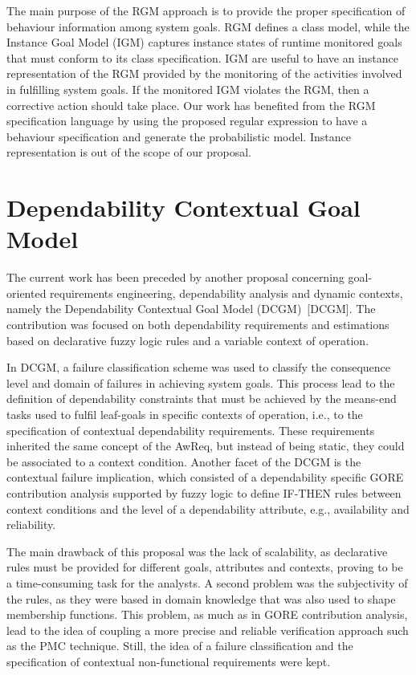 The main purpose of the RGM approach is to provide the proper specification of behaviour information among system goals. RGM defines a class model, while the Instance Goal Model (IGM) captures instance states of runtime monitored goals that must conform to its class specification. IGM are useful to have an instance representation of the RGM provided by the monitoring of the activities involved in fulfilling system goals. If the monitored IGM violates the RGM, then a corrective action should take place. Our work has benefited from the RGM specification language by using the proposed regular expression to have a behaviour specification and generate the probabilistic model. Instance representation is out of the scope of our proposal.


\section{Dependability Contextual Goal Model}

The current work has been preceded by another proposal concerning goal-oriented requirements engineering, dependability analysis and dynamic contexts, namely the Dependability Contextual Goal Model (DCGM)~[DCGM]. The contribution was focused on both dependability requirements and estimations based on declarative fuzzy logic rules and a variable context of operation.

In DCGM, a failure classification scheme was used to classify the consequence level and domain of failures in achieving system goals. This process lead to the definition of dependability constraints that must be achieved by the means-end tasks used to fulfil leaf-goals in specific contexts of operation, i.e., to the specification of contextual dependability requirements. These requirements inherited the same concept of the AwReq, but instead of being static, they could be associated to a context condition. Another facet of the DCGM is the contextual failure implication, which consisted of a dependability specific GORE contribution analysis supported by fuzzy logic to define IF-THEN rules between context conditions and the level of a dependability attribute, e.g., availability and reliability.

The main drawback of this proposal was the lack of scalability, as declarative rules must be provided for different goals, attributes and contexts, proving to be a time-consuming task for the analysts. A second problem was the subjectivity of the rules, as they were based in domain knowledge that was also used to shape membership functions. This problem, as much as in GORE contribution analysis, lead to the idea of coupling a more precise and reliable verification approach such as the PMC technique. Still, the idea of a failure classification and the specification of contextual non-functional requirements were kept.

